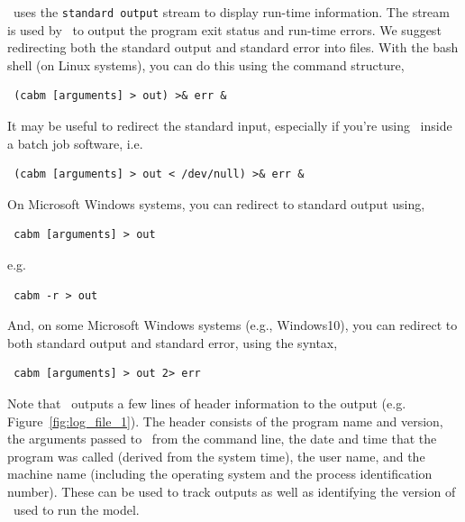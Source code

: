 \IBM\ uses the \texttt{standard output} stream to display run-time information. The  stream is used by \IBM\ to output the program exit status and run-time errors. We suggest redirecting both the standard output and standard error into files. With the bash shell (on Linux systems), you can do this using the command structure,

\begin{verbatim} (cabm [arguments] > out) >& err &\end{verbatim}

It may be useful to redirect the standard input, especially if you're using \IBM\ inside a batch job software, i.e. 

\begin{verbatim} (cabm [arguments] > out < /dev/null) >& err &\end{verbatim}

On Microsoft Windows systems, you can redirect to standard output using,

\begin{verbatim} cabm [arguments] > out\end{verbatim}

e.g.

\begin{verbatim} cabm -r > out\end{verbatim}

And, on some Microsoft Windows systems (e.g., Windows10), you can redirect to both standard output and standard error, using the syntax, 

\begin{verbatim} cabm [arguments] > out 2> err\end{verbatim}

Note that \IBM\ outputs a few lines of header information to the output (e.g. Figure~\ref{fig:log_file_1}). The header consists of the program name and version, the arguments passed to \IBM\ from the command line, the date and time that the program was called (derived from the system time), the user name, and the machine name (including the operating system and the process identification number). These can be used to track outputs as well as identifying the version of \IBM\ used to run the model.


\subsection{\label{sec:command-line-arguments}}

